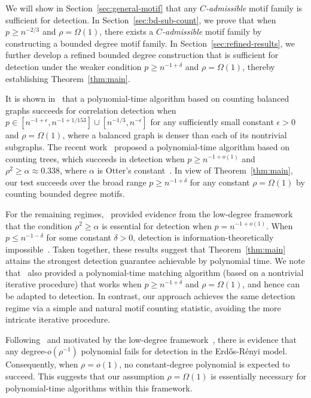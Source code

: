 \documentclass[letterpaper,11pt]{article}
\theoremstyle{definition}
\newcommand{\ER}{Erd\H{o}s-R\'enyi }
\begin{document}
We will show in Section~\ref{sec:general-motif} that any \emph{$C$-admissible} motif family is sufficient for detection.  In Section~\ref{sec:bd-sub-count}, we prove that when $p\ge n^{-2/3}$ and $\rho=\Omega(1)$, there exists a \emph{$C$-admissible} motif family by constructing a bounded degree motif family.  In Section~\ref{sec:refined-results}, we further develop a refined bounded degree construction that is sufficient for detection under the weaker condition $p\ge n^{-1+\delta}$ and $\rho=\Omega(1)$, thereby establishing Theorem~\ref{thm:main}.

It is shown in~\cite{barak2019nearly} that a polynomial-time algorithm based on counting balanced graphs succeeds for correlation detection when $p\in [n^{-1+\epsilon},n^{-1+1/153}]\cup [n^{-1/3},n^{-\epsilon}]$ for any sufficiently small constant $\epsilon>0$ and $\rho=\Omega(1)$, where a balanced graph is denser than each of its nontrivial subgraphs. The recent work~\cite{mao2024testing} proposed a polynomial-time algorithm based on counting trees, which succeeds in detection when $p\ge n^{-1+o(1)}$ and $\rho^2\ge \alpha\approx 0.338$, where $\alpha$ is Otter's constant~\cite{otter1948number}. In view of Theorem~\ref{thm:main}, our test succeeds over the broad range $p\ge n^{-1+\delta}$ for any constant $\rho=\Omega(1)$ by counting bounded degree motifs.%

For the remaining regimes,~\cite{ding2023low} provided evidence from the low-degree framework that the condition $\rho^2\ge \alpha$ is essential for detection when $p=n^{-1+o(1)}$. When $p\le n^{-1-\delta}$ for some constant $\delta>0$, detection is information-theoretically impossible~\cite{wu2023testing,ding2023detection}. Taken together, these results suggest that Theorem~\ref{thm:main} attains the strongest detection guarantee achievable by polynomial time. We note that~\cite{ding2023polynomial} also provided a polynomial-time matching algorithm (based on a nontrivial iterative procedure) that works when $p\ge n^{-1+\delta}$ and $\rho=\Omega(1)$, and hence can be adapted to detection. In contrast, our approach achieves the same detection regime via a simple and natural motif counting statistic, avoiding the more intricate iterative procedure.

Following~\cite{ding2023low,li2025algorithmic} and motivated by the low-degree framework~\cite{hopkins2018statistical}, there is evidence that any degree-$o(\rho^{-1})$ polynomial fails for detection in the \ER model. Consequently, when $\rho=o(1)$, no constant-degree polynomial is expected to succeed. This suggests that our assumption $\rho=\Omega(1)$ is essentially necessary for polynomial-time algorithms within this framework. 
\end{document}
